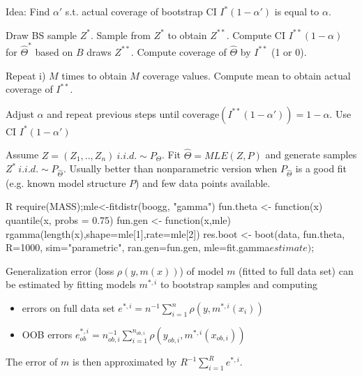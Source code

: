 \begin{sectionbox}
  Idea: Find $\alpha'$ s.t. actual coverage of bootstrap CI $I^{\ast}(1-\alpha')$ is equal to $\alpha$.
  \begin{enumeratenosep}[label=\roman*]
    \item Draw BS sample $Z^{\ast}$. Sample from $Z^{\ast}$ to obtain $Z^{\ast\ast}$. Compute CI $I^{\ast\ast}(1-\alpha)$ for $\hat{\Theta}^{\ast}$ based on $B$ draws $Z^{\ast\ast}$. Compute coverage of $\hat{\Theta}$ by $I^{\ast\ast}$ (1 or 0).
    \item Repeat i) $M$ times to obtain $M$ coverage values. Compute mean to obtain actual coverage of $I^{\ast\ast}$.
    \item Adjust $\alpha$ and repeat previous steps until $\text{coverage}(I^{\ast\ast}(1-\alpha')) = 1 -\alpha$. Use CI $I^{\ast}(1-\alpha')$
  \end{enumeratenosep}
\end{sectionbox}	

\begin{sectionbox}
  Assume $Z = (Z_1,..,Z_n) ~i.i.d. \sim P_{\Theta}$. Fit $\hat{\Theta} = MLE(Z, P)$ and generate samples $Z^{\ast} ~i.i.d. \sim P_{\hat{\Theta}}$. Usually better than nonparametric version when $P_{\hat{\Theta}}$ is a good fit (e.g. known model structure $P$) and few data points available.
  \begin{mintlinebox}{R}
    require(MASS);mle<-fitdistr(boogg, "gamma")
    fun.theta <- function(x) {quantile(x, probs = 0.75)}
    fun.gen <- function(x,mle) {rgamma(length(x),shape=mle[1],rate=mle[2])}
    res.boot <- boot(data, fun.theta, R=1000, sim="parametric", ran.gen=fun.gen, mle=fit.gamma$estimate); $
  \end{mintlinebox}		
\end{sectionbox}	

\begin{sectionbox}
  Generalization error (loss $\rho(y,m(x))$) of model $m$ (fitted to full data set) can be estimated by fitting models $m^{\ast,i}$ to bootstrap samples and computing
  \begin{itemize}
    \item errors on full data set $e^{\ast,i} = n^{-1}\sum_{i=1}^n \rho(y,m^{\ast,i}(x_i)) $
    \item OOB errors $e^{\ast,i}_{ob} = n_{ob,i}^{-1}\sum_{i=1}^{n_{ob,i}} \rho(y_{ob,i},m^{\ast,i}(x_{ob,i})) $
  \end{itemize}
  The error of $m$ is then approximated by $R^{-1}\sum_{i=1}^R e^{\ast,i}$.		
\end{sectionbox}
